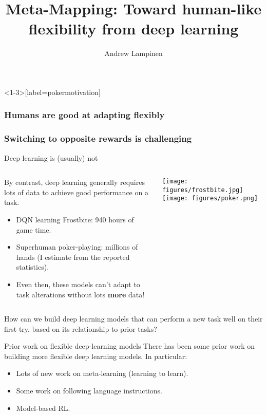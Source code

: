 \documentclass{beamer}
\begin{document}
\title{Meta-Mapping: Toward human-like flexibility from deep learning}
\author{Andrew Lampinen}
\date{}
\frame{\titlepage}

\begin{frame}<1-3>[label=pokermotivation]
\frametitle<1-4>{Humans are good at adapting flexibly}
\frametitle<5>{Switching to opposite rewards is challenging}
\centering
{}
\end{frame}

\begin{frame}{Deep learning is (usually) not}
\begin{columns}
\begin{column}{0.5\textwidth}
By contrast, deep learning generally requires lots of data to achieve good performance on a task. 
\begin{itemize}[<+(1)->]
    \item DQN learning Frostbite: 940 hours of game time.
    \item Superhuman poker-playing: millions of hands (I estimate from the reported statistics). 
    \item Even then, these models can't adapt to task alterations without lots \textbf{more} data! 
\end{itemize}
\end{column}

\begin{column}{0.5\textwidth}
\texttt{[image: figures/frostbite.jpg]}
\texttt{[image: figures/poker.png]}
\end{column}
\end{columns}
\end{frame}

\begin{frame}[standout]
How can we build deep learning models that can perform a new task well on their first try, based on its relationship to prior tasks?
\end{frame}

\begin{frame}{Prior work on flexible deep-learning models}
There has been some prior work on building more flexible deep learning models. In particular: 
\begin{itemize}[<+(1)->]
    \item Lots of new work on meta-learning (learning to learn).
    \item Some work on following language instructions.
    \item Model-based RL. 
\end{itemize}
\end{frame}
\end{document}

